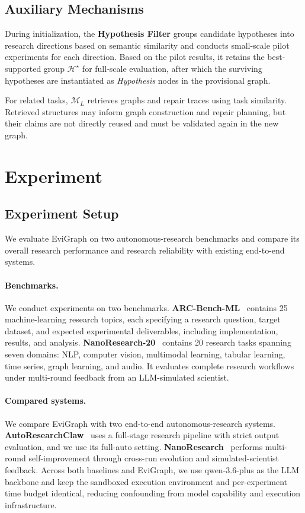 \documentclass[letterpaper]{article} %
\begin{document}
\subsection{Auxiliary Mechanisms}
\label{sec:auxiliary-mechanisms}

During initialization, the \textbf{Hypothesis Filter} groups candidate hypotheses into research directions based on semantic similarity and conducts small-scale pilot experiments for each direction. Based on the pilot results, it retains the best-supported group $\mathcal{H}^{\star}$ for full-scale evaluation, after which the surviving hypotheses are instantiated as \textit{Hypothesis} nodes in the provisional graph.

For related tasks, $\mathcal{M}_L$ retrieves graphs and repair traces using task similarity. Retrieved structures may inform graph construction and repair planning, but their claims are not directly reused and must be validated again in the new graph.


\section{Experiment}
\label{sec:experiment}


\subsection{Experiment Setup}
\label{sec:evaluation}

We evaluate EviGraph on two autonomous-research benchmarks and compare its
overall research performance and research reliability with existing
end-to-end systems.

\paragraph{Benchmarks.}
We conduct experiments on two benchmarks. \textbf{ARC-Bench-ML}~\citep{autoresearchclaw2026} contains 25 machine-learning research topics, each specifying a research question, target dataset, and expected experimental deliverables, including implementation, results, and analysis. \textbf{NanoResearch-20}~\citep{nanoresearch2026} contains 20 research tasks spanning seven domains: NLP, computer vision, multimodal learning, tabular learning, time series, graph learning, and audio. It evaluates complete research workflows under multi-round feedback from an LLM-simulated scientist.

\paragraph{Compared systems.}
We compare EviGraph with two end-to-end autonomous-research systems. \textbf{AutoResearchClaw}~\citep{autoresearchclaw2026} uses a full-stage research pipeline with strict output evaluation, and we use its full-auto setting. \textbf{NanoResearch}~\citep{nanoresearch2026} performs multi-round self-improvement through cross-run evolution and simulated-scientist feedback. Across both baselines and EviGraph, we use qwen-3.6-plus as the LLM backbone and keep the sandboxed execution environment and per-experiment time budget identical, reducing confounding from model capability and execution infrastructure.
\end{document}
